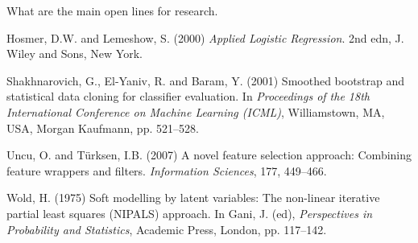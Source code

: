 \documentclass[a4paper,11pt]{article}
\begin{document}
What are the main open lines for research.




\begin{thebibliography}{}

Hosmer, D.W. and Lemeshow, S. (2000) \textit{Applied Logistic Regression}. 2nd edn, J. Wiley and Sons, New York.

Shakhnarovich, G., El-Yaniv, R. and Baram, Y. (2001) Smoothed bootstrap and statistical data cloning for classifier
evaluation. In \textit{Proceedings of the 18th International Conference on Machine Learning (ICML)}, Williamstown, MA, USA, Morgan Kaufmann, pp.
521--528.

Uncu, O. and T\"urksen, I.B. (2007) A novel feature selection
approach: Combining feature wrappers and filters. \textit{Information Sciences}, 177, 449--466.

 Wold, H. (1975) Soft modelling by latent variables: The non-linear iterative partial least squares ({NIPALS})
approach. In Gani, J. (ed), \textit{Perspectives in Probability and Statistics}, Academic Press, London, pp. 117--142.


\end{thebibliography}
\end{document}
